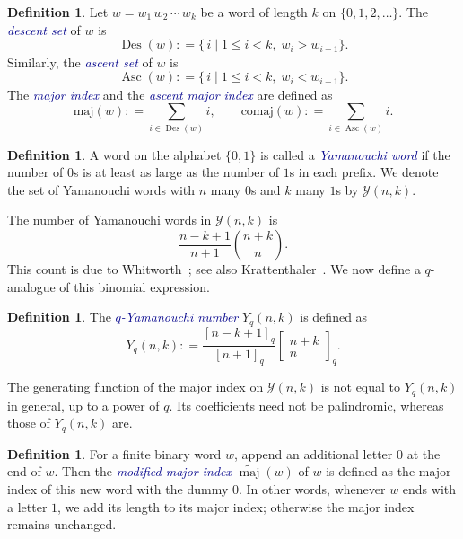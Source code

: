 \documentclass[11pt]{article}
\theoremstyle{definition}
\newtheorem{definition}[theorem]{Definition}
\theoremstyle{remark}
\theoremstyle{definition}
\numberwithin{equation}{section}
\newcommand{\coloneq}{\mathrel{\mathop:}=}
\renewcommand\emph[1]{\textcolor{darkblue}{\it #1}}
\begin{document}
\begin{definition}
Let $w = w_1\,w_2\,\cdots\,w_k$ be a word of length \(k\) on $\{0,1,2,\ldots\}$. The \emph{descent set} of \(w\) is
    \[
      \operatorname{Des}(w)
      \coloneq
      \{\,i \mid 1\le i < k,\; w_i > w_{i+1}\}.
    \]
Similarly, the \emph{ascent set} of \(w\) is
    \[
      \operatorname{Asc}(w)
      \coloneq
      \{\,i \mid 1\le i < k,\; w_i < w_{i+1}\}.
    \]
The \emph{major index} and the \emph{ascent major index} are defined as
      \[
        \mathrm{maj}(w)
        \coloneq
        \sum_{i\in\operatorname{Des}(w)} i,\hspace{2em} \mathrm{comaj}(w)
        \coloneq
        \sum_{i\in\operatorname{Asc}(w)} i.
      \]
\end{definition}

\begin{definition}\label{def:Yam_word}
A word on the alphabet $\{0,1\}$ is called a \emph{Yamanouchi word} if the number of $0$s is at least as large as the number of $1$s in each prefix. We denote the set of Yamanouchi words with $n$ many $0$s and $k$ many $1$s by $\mathcal{Y}(n,k)$. 
\end{definition}


The number of Yamanouchi words in $\mathcal{Y}(n,k)$ is
\[\frac{n-k+1}{n+1}\binom{n+k}{n}.\]
This count is due to Whitworth~\cite[Proposition~II, p.~109]{Whi79}; see also Krattenthaler~\cite[Corollary~10.3.2]{Kra15}. We now
define a $q$-analogue of this binomial expression.

\begin{definition}\label{def:q-Yam}
The \emph{$q$-Yamanouchi number} $Y_q(n,k)$ is defined as
\[
Y_q(n,k) \coloneq \frac{[n-k+1]_q}{[n+1]_q}\begin{bmatrix} n+k \\ n \end{bmatrix}_q.
\]
\end{definition}

The generating function of the major index on $\mathcal{Y}(n,k)$ is
not equal to $Y_q(n,k)$ in general, up to a power of $q$. Its
coefficients need not be palindromic, whereas those of $Y_q(n,k)$ are.

\begin{definition}\label{def:mod_maj}
  For a finite binary word \( w \), append an additional letter $0$ at
  the end of $w$. Then the \emph{modified major index}
  $\widetilde{\operatorname{maj}}(w)$ of $w$ is defined as the major
  index of this new word with the dummy $0$. In other words, whenever
  $w$ ends with a letter $1$, we add its length to its major index;
  otherwise the major index remains unchanged.
\end{definition}
\end{document}
